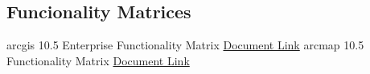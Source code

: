 %
%
%
\subsection{Funcionality Matrices}
arcgis 10.5 Enterprise Functionality Matrix
\href{../../documentation/references/ESRI/arcgis10.5EnterpriseFunctionalityMatrix.pdf}{Document Link}
\linebreak
arcmap 10.5 Functionality Matrix
\href{../../documentation/references/ESRI/arcmap10.5FunctionalityMatrix.pdf}{Document Link}

